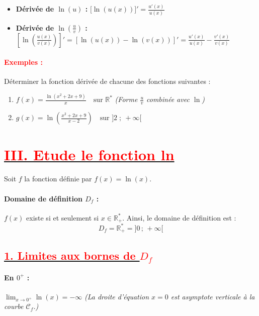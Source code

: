 \documentclass[12pt,a4paper]{article}
\begin{document}
\begin{itemize}
    \item \textbf{Dérivée de $\ln(u)$ :}
    \(
    \big[\ln(u(x))\big]' = \frac{u'(x)}{u(x)}
    \)

    \item \textbf{Dérivée de $\ln\left(\frac{u}{v}\right)$ :}
    \(
    \left[\ln\left(\frac{u(x)}{v(x)}\right)\right]' = \left[\ln(u(x)) - \ln(v(x))\right]' = \frac{u'(x)}{u(x)} - \frac{v'(x)}{v(x)}
    \)
\end{itemize}

\paragraph{\textcolor{red}{Exemples :}}
Déterminer la fonction dérivée de chacune des fonctions suivantes :

\begin{enumerate}
    \item $f(x) = \frac{\ln(x^{2}+2x+9)}{x} \quad \text{sur } \mathbb{R}^*$ 
    \quad \textit{(Forme $\frac{u}{v}$ combinée avec $\ln$)}
    
    \item $g(x) = \ln\left(\frac{x^{2}+2x+9}{x-2}\right) \quad \text{sur } ]2 \;;\ +\infty[$
\end{enumerate}
\section*{\underline{\textbf{\textcolor{red}{III. Etude le fonction ln}}}}

Soit $f$ la fonction définie par $f(x) = \ln(x)$.

\paragraph{Domaine de définition $D_{f}$ :}
$f(x)$ existe si et seulement si $x \in \mathbb{R}^*_+$. 
Ainsi, le domaine de définition est :
\[
D_{f} = \mathbb{R}^*_+ = ]0\,;\,+\infty[
\]

\subsection*{\underline{\textbf{\textcolor{red}{1. Limites aux bornes de $D_{f}$}}}}

\paragraph{En $0^+$ :}
\(
\lim_{x \to 0^+} \ln(x) = -\infty
\)
\textit{(La droite d'équation $x = 0$ est asymptote verticale à la courbe $\mathcal{C}_f$.)}
\end{document}
